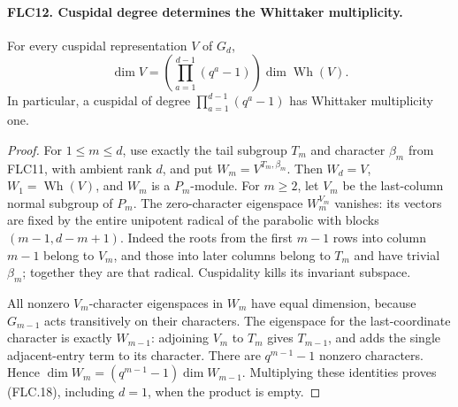 \documentclass[11pt,a4paper]{article}
\numberwithin{equation}{section}
\theoremstyle{remark}\newtheorem{remark}[theorem]{Remark}
\begin{document}
\paragraph{FLC12. Cuspidal degree determines the Whittaker multiplicity.}
\label{claim:FLC12}
For every cuspidal representation $V$ of $G_d$,
\[
 \dim V=\left(\prod_{a=1}^{d-1}(q^a-1)\right)
                         \dim\operatorname{Wh}(V).
 \tag{FLC.18}
\]
In particular, a cuspidal of degree
$\prod_{a=1}^{d-1}(q^a-1)$ has Whittaker multiplicity one.
\begin{proof}
For $1\le m\le d$, use exactly the tail subgroup $T_m$ and
character $\beta_m$ from FLC11, with ambient rank $d$,
and put $W_m=V^{T_m,\beta_m}$.
Then $W_d=V$, $W_1=\operatorname{Wh}(V)$, and $W_m$ is a
$P_m$-module.  For $m\ge2$, let $V_m$ be the last-column
normal subgroup of $P_m$.
The zero-character eigenspace $W_m^{V_m}$ vanishes: its
vectors are fixed by the entire unipotent radical of the
parabolic with blocks $(m-1,d-m+1)$.
Indeed the roots from the first $m-1$ rows into column $m-1$
belong to $V_m$, and those into later columns belong to $T_m$
and have trivial $\beta_m$; together they are that radical.
Cuspidality kills its invariant subspace.

All nonzero $V_m$-character eigenspaces in $W_m$ have equal
dimension, because $G_{m-1}$ acts transitively on their
characters.  The eigenspace for the last-coordinate character
is exactly $W_{m-1}$: adjoining $V_m$ to $T_m$ gives
$T_{m-1}$, and adds the single adjacent-entry term to its
character.  There are $q^{m-1}-1$ nonzero characters.  Hence
$\dim W_m=(q^{m-1}-1)\dim W_{m-1}$.
Multiplying these identities proves (FLC.18), including
$d=1$, when the product is empty.
\end{proof}

\end{document}
